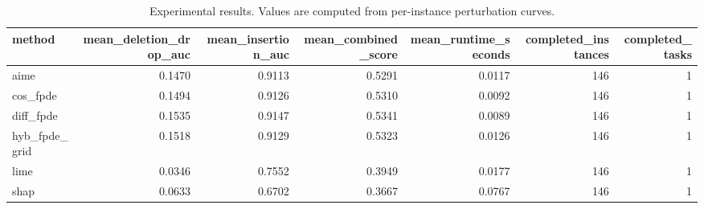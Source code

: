 \begin{table}[t]
\caption{Experimental results. Values are computed from per-instance perturbation curves.}
\label{tab:main_results_computed}
\centering
\begin{tabular}{lrrrrrr}
\toprule
method & mean\_deletion\_drop\_auc & mean\_insertion\_auc & mean\_combined\_score & mean\_runtime\_seconds & completed\_instances & completed\_tasks \\
\midrule
aime & 0.1470 & 0.9113 & 0.5291 & 0.0117 & 146 & 1 \\
cos\_fpde & 0.1494 & 0.9126 & 0.5310 & 0.0092 & 146 & 1 \\
diff\_fpde & 0.1535 & 0.9147 & 0.5341 & 0.0089 & 146 & 1 \\
hyb\_fpde\_grid & 0.1518 & 0.9129 & 0.5323 & 0.0126 & 146 & 1 \\
lime & 0.0346 & 0.7552 & 0.3949 & 0.0177 & 146 & 1 \\
shap & 0.0633 & 0.6702 & 0.3667 & 0.0767 & 146 & 1 \\
\bottomrule
\end{tabular}

\end{table}
